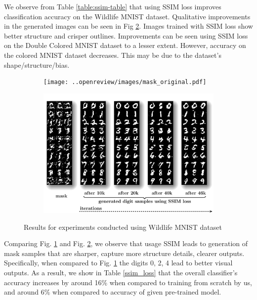 We observe from Table \ref{table:ssim-table} that using SSIM \cite{wang2004image} loss improves classification accuracy on the Wildlife MNIST dataset. Qualitative improvements in the generated images can be seen in Fig \ref{fig:ssim_grid_mask}. Images trained with SSIM \cite{wang2004image} loss show better structure and crisper outlines. Improvements can be seen using SSIM \cite{wang2004image} loss on the  Double Colored MNIST dataset to a lesser extent. However, accuracy on the colored MNIST dataset decreases. This may be due to the dataset's shape/structure/bias.
\begin{figure}[ht!]
\vspace{-5mm}
    \begin{subfigure}[b]{0.5\textwidth}
    \centering
    \texttt{[image: ..openreview/images/mask\_original.pdf]}
    \label{fig:original_grid_mask1}
    \end{subfigure}
    \hfill
\begin{subfigure}[b]{0.5\textwidth}
\centering 
    \includegraphics[width=0.9\linewidth]{../openreview/images/mask_ssim.pdf}
    \label{fig:ssim_grid_mask}
\end{subfigure}
\caption{Results for experiments conducted using Wildlife MNIST dataset}
\label{fig:mnist_ssim_both}
\end{figure}
 Comparing Fig. \ref{fig:original_grid_mask1} and Fig. \ref{fig:ssim_grid_mask}, we observe that usage SSIM \cite{wang2004image} leads to generation of mask samples that are sharper, capture more structure details, clearer outputs. Specifically, when compared to Fig. \ref{fig:original_grid_mask1} the digits 0, 2, 4 lead to better visual outputs. As a result, we show in Table \ref{ssim_loss} that the overall classifier's accuracy increases by around 16\% when compared to training from scratch by us, and around 6\% when compared to accuracy of given pre-trained model. 

